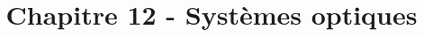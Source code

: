 \newenvironment{defn}[1]
 {\begin{leftbar}\noindent \textbf{Définition :\textit{ \quad #1} } } { \end{leftbar}} 
\newenvironment{rmrq}
 {\begin{shaded} \textbf{Remarque: Pour aller plus loin ...}\\ \itshape } { \end{shaded}}




\usepackage{fancyhdr}
\pagestyle{fancy}
\fancyhf{}
\title{Chapitre 12 - Systèmes optiques}
\date{}
\author{}

\setlength{\parindent}{0mm}
\setlength{\parskip}{2mm}


%

%